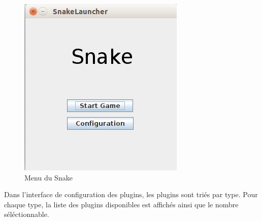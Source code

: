 \documentclass[12pt,a4paper]{article}
\begin{document}
\begin{figure}[h]
    \centering
    \includegraphics[scale=0.5]{ressourcesSnake/menu.png}
    \caption{Menu du Snake}
\end{figure}    

\newpage
    Dans l'interface de configuration des plugins, les plugins sont triés par type. Pour chaque type, la liste des plugins disponibles est affichés ainsi que le nombre séléctionnable.\\
\end{document}
